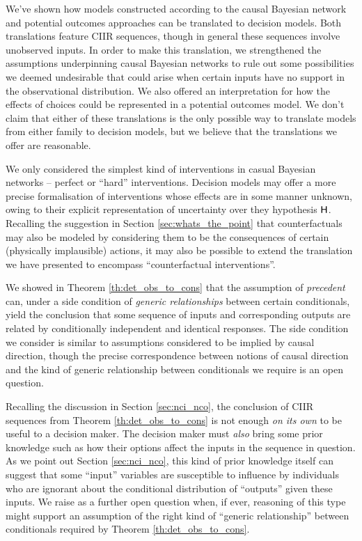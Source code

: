 We've shown how models constructed according to the causal Bayesian network and potential outcomes approaches can be translated to decision models. Both translations feature CIIR sequences, though in general these sequences involve unobserved inputs. In order to make this translation, we strengthened the assumptions underpinning causal Bayesian networks to rule out some possibilities we deemed undesirable that could arise when certain inputs have no support in the observational distribution. We also offered an interpretation for how the effects of choices could be represented in a potential outcomes model. We don't claim that either of these translations is the only possible way to translate models from either family to decision models, but we believe that the translations we offer are reasonable.

We only considered the simplest kind of interventions in casual Bayesian networks -- perfect or ``hard'' interventions. Decision models may offer a more precise formalisation of interventions whose effects are in some manner unknown, owing to their explicit representation of uncertainty over they hypothesis $\mathsf{H}$. Recalling the suggestion in Section \ref{sec:whats_the_point} that counterfactuals may also be modeled by considering them to be the consequences of certain (physically implausible) actions, it may also be possible to extend the translation we have presented to encompass ``counterfactual interventions''.

We showed in Theorem \ref{th:det_obs_to_cons} that the assumption of \emph{precedent} can, under a side condition of \emph{generic relationships} between certain conditionals, yield the conclusion that some sequence of inputs and corresponding outputs are related by conditionally independent and identical responses. The side condition we consider is similar to assumptions considered to be implied by causal direction, though the precise correspondence between notions of causal direction and the kind of generic relationship between conditionals we require is an open question.

Recalling the discussion in Section \ref{sec:nci_nco}, the conclusion of CIIR sequences from Theorem \ref{th:det_obs_to_cons} is not enough \emph{on its own} to be useful to a decision maker. The decision maker must \emph{also} bring some prior knowledge such as how their options affect the inputs in the sequence in question. As we point out Section \ref{sec:nci_nco}, this kind of prior knowledge itself can suggest that some ``input'' variables are susceptible to influence by individuals who are ignorant about the conditional distribution of ``outputs'' given these inputs. We raise as a further open question when, if ever, reasoning of this type might support an assumption of the right kind of ``generic relationship'' between conditionals required by Theorem \ref{th:det_obs_to_cons}.

